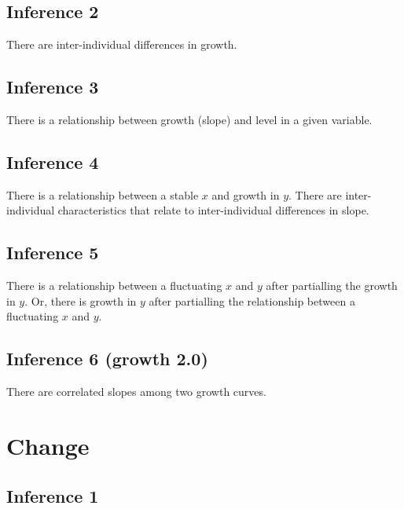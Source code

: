\documentclass[english,,man]{apa6}
\theoremstyle{definition}
\theoremstyle{definition}
\theoremstyle{definition}
\theoremstyle{remark}
\begin{document}
\hypertarget{inference-2-4}{%
\subsection{Inference 2}\label{inference-2-4}}

There are inter-individual differences in growth.

\hypertarget{inference-3-2}{%
\subsection{Inference 3}\label{inference-3-2}}

There is a relationship between growth (slope) and level in a given
variable.

\hypertarget{inference-4-2}{%
\subsection{Inference 4}\label{inference-4-2}}

There is a relationship between a stable \(x\) and growth in \(y\).
There are inter-individual characteristics that relate to
inter-individual differences in slope.

\hypertarget{inference-5-1}{%
\subsection{Inference 5}\label{inference-5-1}}

There is a relationship between a fluctuating \(x\) and \(y\) after
partialling the growth in \(y\). Or, there is growth in \(y\) after
partialling the relationship between a fluctuating \(x\) and \(y\).

\hypertarget{inference-6-growth-2.0}{%
\subsection{Inference 6 (growth 2.0)}\label{inference-6-growth-2.0}}

There are correlated slopes among two growth curves.

\hypertarget{change-1}{%
\section{Change}\label{change-1}}

\hypertarget{inference-1-7}{%
\subsection{Inference 1}\label{inference-1-7}}
\end{document}
